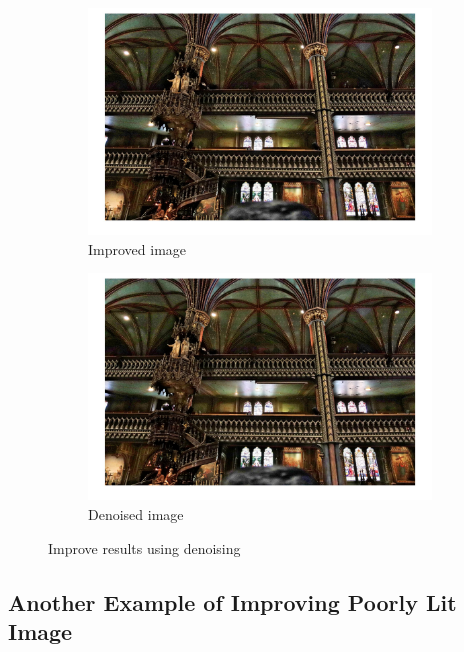 \documentclass[conference]{IEEEtran}
\begin{document}
\begin{figure}[h!]
\centering
\begin{subfigure}[b]{0.4\linewidth}
\includegraphics[width=\linewidth]{images/img25.jpg}
\caption{Improved image}
\end{subfigure}
\begin{subfigure}[b]{0.4\linewidth}
\includegraphics[width=\linewidth]{images/img26.jpg}
\caption{Denoised image}
\end{subfigure}
\caption{Improve results using denoising}
\label{fig:Denoising}
\end{figure}

\subsection{Another Example of Improving Poorly Lit Image}
\end{document}
